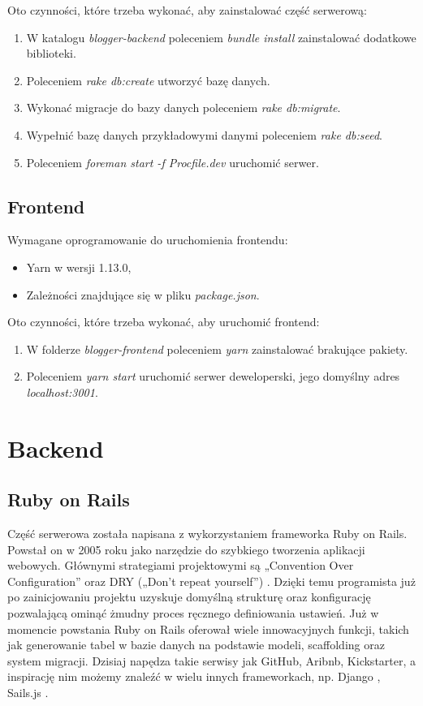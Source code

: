 \documentclass[declaration,shortabstract,polish,inz]{iithesis}
\begin{document}
Oto czynności, które trzeba wykonać, aby zainstalować część serwerową:
\begin{enumerate}
    \item W katalogu \textit{blogger-backend} poleceniem \textit{bundle install} zainstalować dodatkowe biblioteki.
    \item Poleceniem \textit{rake db:create} utworzyć bazę danych.
    \item Wykonać migracje do bazy danych poleceniem \textit{rake db:migrate}.
    \item Wypełnić bazę danych przykładowymi danymi poleceniem \textit{rake db:seed}.
    \item Poleceniem \textit{foreman start -f Procfile.dev} uruchomić serwer.
\end{enumerate}

\subsection{Frontend}
Wymagane oprogramowanie do uruchomienia frontendu:
    \begin{itemize}
        \item Yarn \cite{yarn} w wersji 1.13.0,
        \item Zależności znajdujące się w pliku \textit{package.json}.
    \end{itemize}

Oto czynności, które trzeba wykonać, aby uruchomić frontend:
\begin{enumerate}
    \item W folderze \textit{blogger-frontend} poleceniem \textit{yarn} zainstalować brakujące pakiety.
    \item Poleceniem \textit{yarn start} uruchomić serwer deweloperski, jego domyślny adres \textit{localhost:3001}.
\end{enumerate}

\section{Backend}
\subsection{Ruby on Rails}
Część serwerowa została napisana z wykorzystaniem frameworka Ruby on Rails. Powstał on w 2005 roku \cite{rorwiki} jako narzędzie do szybkiego tworzenia aplikacji webowych. Głównymi strategiami projektowymi są „Convention Over Configuration” \cite{coc} oraz DRY („Don’t repeat yourself”) \cite{dry}. Dzięki temu programista już po zainicjowaniu projektu uzyskuje domyślną strukturę oraz konfigurację pozwalającą ominąć żmudny proces ręcznego definiowania ustawień. Już w momencie powstania Ruby on Rails oferował wiele innowacyjnych funkcji, takich jak generowanie tabel w bazie danych na podstawie modeli, scaffolding oraz system migracji. Dzisiaj napędza takie serwisy jak GitHub, Aribnb, Kickstarter, a inspirację nim możemy znaleźć w wielu innych frameworkach, np. Django \cite{django}, Sails.js \cite{sails}.
\end{document}
